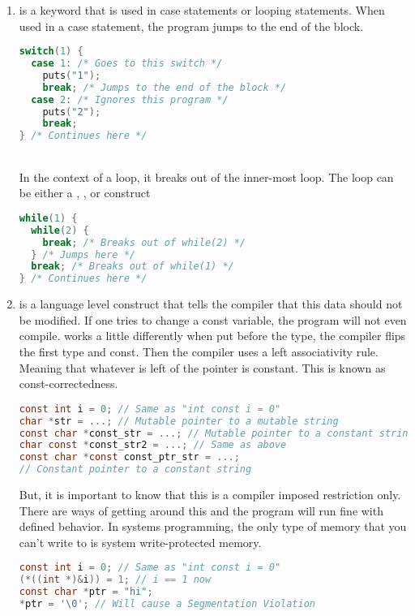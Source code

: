 \begin{enumerate}
\item {} is a keyword that is used in case statements or looping statements. When used in a case statement, the program jumps to the end of the block.
\\
\begin{lstlisting}[language=C]
switch(1) {
  case 1: /* Goes to this switch */
    puts("1");
    break; /* Jumps to the end of the block */
  case 2: /* Ignores this program */
    puts("2");
    break;
} /* Continues here */
\end{lstlisting}
\\
In the context of a loop, it breaks out of the inner-most loop. The loop can be either a , , or  construct
\\
\begin{lstlisting}[language=C]
while(1) {
  while(2) {
    break; /* Breaks out of while(2) */
  } /* Jumps here */
  break; /* Breaks out of while(1) */
} /* Continues here */
\end{lstlisting}
\item {} is a language level construct that tells the compiler that this data should not be modified. If one tries to change a const variable, the program will not even compile.  works a little differently when put before the type, the compiler flips the first type and const. Then the compiler uses a left associativity rule. Meaning that whatever is left of the pointer is constant. This is known as const-correctedness.
\\
\begin{lstlisting}[language=C]
const int i = 0; // Same as "int const i = 0"
char *str = ...; // Mutable pointer to a mutable string
const char *const_str = ...; // Mutable pointer to a constant string
char const *const_str2 = ...; // Same as above
const char *const const_ptr_str = ...;
// Constant pointer to a constant string
\end{lstlisting}

But, it is important to know that this is a compiler imposed restriction only. There are ways of getting around this and the program will run fine with defined behavior. In systems programming, the only type of memory that you can't write to is system write-protected memory.

\begin{lstlisting}[language=C]
const int i = 0; // Same as "int const i = 0"
(*((int *)&i)) = 1; // i == 1 now
const char *ptr = "hi";
*ptr = '\0'; // Will cause a Segmentation Violation
\end{lstlisting}


\end{enumerate}
